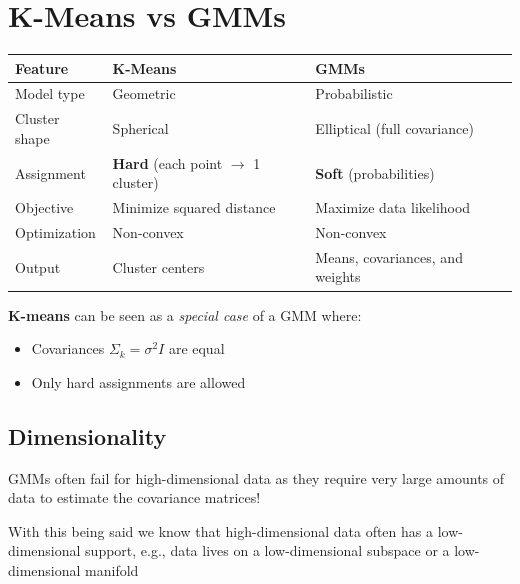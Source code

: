 \documentclass[11pt]{article}
\begin{document}
\section*{K-Means vs GMMs}

\begin{center}
	\begin{tabular}{|l|l|l|}
		\hline
		\textbf{Feature} & \textbf{K-Means}                                   & \textbf{GMMs}                   \\
		\hline
		Model type       & Geometric                                          & Probabilistic                   \\
		\hline
		Cluster shape    & Spherical                                          & Elliptical (full covariance)    \\
		\hline
		Assignment       & \textbf{Hard} (each point $\rightarrow$ 1 cluster) & \textbf{Soft} (probabilities)   \\
		\hline
		Objective        & Minimize squared distance                          & Maximize data likelihood        \\
		\hline
		Optimization     & Non-convex                                         & Non-convex                      \\
		\hline
		Output           & Cluster centers                                    & Means, covariances, and weights \\
		\hline
	\end{tabular}
\end{center}

\vspace{1em}

\noindent\textbf{K-means} can be seen as a \textit{special case} of a GMM where:
\begin{itemize}
	\item Covariances $\Sigma_k = \sigma^2 I$ are equal
	\item Only hard assignments are allowed
\end{itemize}

\subsection*{Dimensionality}
GMMs often fail for high-dimensional data as they require very large amounts of data to estimate the covariance matrices!

\medskip

With this being said we know that high-dimensional data often has a low-dimensional support, e.g., data lives on a low-dimensional
subspace or a low-dimensional manifold
\end{document}
